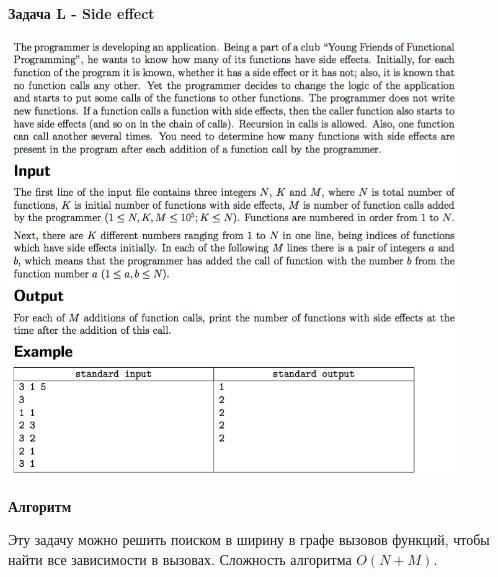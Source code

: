 \documentclass[a4paper,12pt]{article}
\begin{document}
\newpage
\textbf{{\large Задача L - Side effect}}

\begin{center}
\includegraphics[width=0.9\textwidth]{OC_Siberia/L.png}\\ [1cm]
\end{center}

\textbf{{\large Алгоритм}}

Эту задачу можно решить поиском в ширину в графе вызовов функций, чтобы найти все зависимости в вызовах. Сложность алгоритма $O(N + M)$. \\
\end{document}
